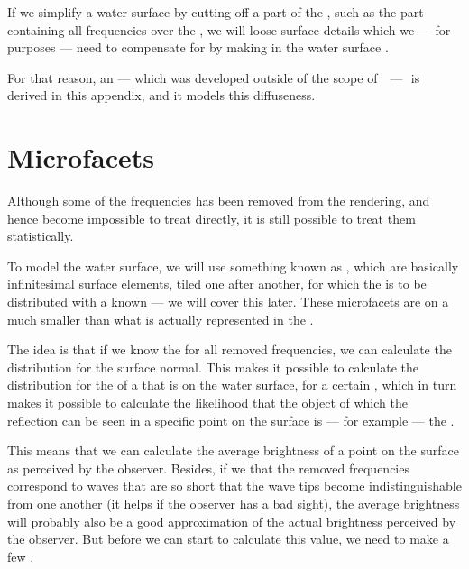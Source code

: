 {
If we simplify a water surface by cutting off a part of the , such as the part containing all frequencies over the , we will loose surface details which we --- for \visualization purposes --- need to compensate for by making  in the water surface .

For that reason, an  --- which was developed outside of the scope of \thismasterthesiswork\ \,---\ \,is derived in this appendix, and it models this diffuseness.

\section{Microfacets}

Although some of the frequencies has been removed from the rendering, and hence become impossible to treat directly, it is still possible to treat them statistically.

To model the water surface, we will use something known as \microfacets, which are basically infinitesimal surface elements, tiled one after another, for which the  is \assumed to be \stochastically distributed with a known  --- we will cover this later. These microfacets are on a much smaller \scale than what is actually represented in the \rendering.

The idea is that if we know the  for all removed frequencies, we can calculate the distribution for the surface normal. This makes it possible to calculate the distribution for the  of a \ray that is  on the water surface, for a certain , which in turn makes it possible to calculate the likelihood that the object of which the reflection can be seen in a specific point on the surface is --- for example --- the \sun.

This means that we can calculate the average brightness of a point on the surface as perceived by the observer. Besides, if we \assume that the removed frequencies correspond to waves that are so short that the wave tips become indistinguishable from one another (it helps if the observer has a bad sight), the average brightness will probably also be a good approximation of the actual brightness perceived by the observer. But before we can start to calculate this value, we need to make a few \assumptions.

}

